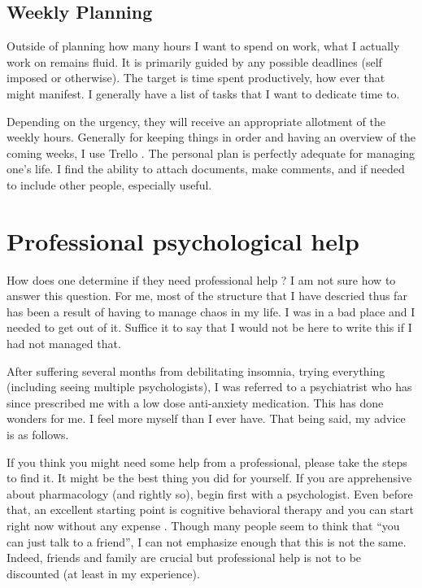 \documentclass[10pt,twocolumn]{extarticle}
\begin{document}
\subsection{Weekly Planning}
Outside of planning how many hours I want to spend on work, what I actually work on remains fluid. It is primarily guided by any possible deadlines (self imposed or otherwise). The target is time spent productively, how ever that might manifest. I generally have a list of tasks that I want to dedicate time to. 

Depending on the urgency, they will receive an appropriate allotment of the weekly hours. Generally for keeping things in order and having an overview of the coming weeks, I use Trello \cite{trello}. The personal plan is perfectly adequate for managing one's life. I find the ability to attach documents, make comments, and if needed to include other people, especially useful.


\section{Professional psychological help}
\label{sec:help}

How does one determine if they need professional help ? I am not sure how to answer this question. For me, most of the structure that I have descried thus far has been a result of having to manage chaos in my life. I was in a bad place and I needed to get out of it. Suffice it to say that I would not be here to write this if I had not managed that. 

After suffering several months from debilitating insomnia, trying everything (including seeing multiple psychologists), I was referred to a psychiatrist who has since prescribed me with a low dose anti-anxiety medication. This has done wonders for me. I feel more myself than I ever have. That being said, my advice is as follows.

If you think you might need some help from a professional, please take the steps to find it. It might be the best thing you did for yourself. If you are apprehensive about pharmacology (and rightly so), begin first with a psychologist. Even before that, an excellent starting point is cognitive behavioral therapy and you can start right now without any expense \cite{how_to_do_cbt}. Though many people seem to think that ``you can just talk to a friend'', I can not emphasize enough that this is not the same. Indeed, friends and family are crucial but professional help is not to be discounted (at least in my experience). 
\end{document}
